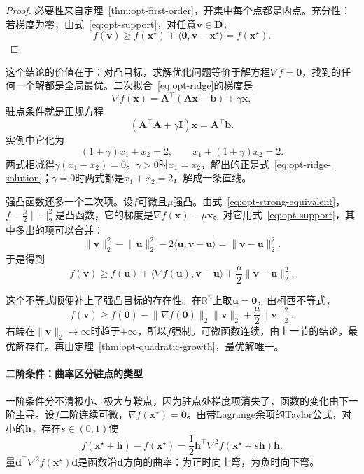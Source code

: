 \begin{proof}
必要性来自定理~\ref{thm:opt-first-order}，开集中每个点都是内点。充分性：若梯度为零，由式~\eqref{eq:opt-support}，对任意$\bm{v}\in\bm{D}$，
\[
 f(\bm{v})\geq f(\bm{x}^\star)+\langle\bm{0},\bm{v}-\bm{x}^\star\rangle=f(\bm{x}^\star).
\]
\end{proof}

这个结论的价值在于：对凸目标，求解优化问题等价于解方程$\nabla f=\bm{0}$，找到的任何一个解都是全局最优。二次拟合~\eqref{eq:opt-ridge}的梯度是
\begin{equation}
 \nabla f(\bm{x})=\bm{A}^\top(\bm{A}\bm{x}-\bm{b})+\gamma\bm{x},
 \label{eq:opt-ridge-gradient}
\end{equation}
驻点条件就是正规方程
\[
 (\bm{A}^\top\bm{A}+\gamma\bm{I})\bm{x}=\bm{A}^\top\bm{b}.
\]
实例中它化为
\[
 (1+\gamma)x_1+x_2=2,\qquad x_1+(1+\gamma)x_2=2.
\]
两式相减得$\gamma(x_1-x_2)=0$。$\gamma>0$时$x_1=x_2$，解出的正是式~\eqref{eq:opt-ridge-solution}；$\gamma=0$时两式都是$x_1+x_2=2$，解成一条直线。

强凸函数还多一个二次项。设$f$可微且$\mu$强凸。由式~\eqref{eq:opt-strong-equivalent}，$f-\frac{\mu}{2}\lVert\cdot\rVert_2^2$是凸函数，它的梯度是$\nabla f(\bm{x})-\mu\bm{x}$。对它用式~\eqref{eq:opt-support}，其中多出的项可以合并：
\[
 \lVert\bm{v}\rVert_2^2-\lVert\bm{u}\rVert_2^2-2\langle\bm{u},\bm{v}-\bm{u}\rangle=\lVert\bm{v}-\bm{u}\rVert_2^2.
\]
于是得到
\begin{equation}
 f(\bm{v})\geq f(\bm{u})+\langle\nabla f(\bm{u}),\bm{v}-\bm{u}\rangle+\frac{\mu}{2}\lVert\bm{v}-\bm{u}\rVert_2^2.
 \label{eq:opt-strong-support}
\end{equation}

这个不等式顺便补上了强凸目标的存在性。在$\mathbb{R}^n$上取$\bm{u}=\bm{0}$，由柯西不等式，
\[
 f(\bm{v})\geq f(\bm{0})-\lVert\nabla f(\bm{0})\rVert_2\lVert\bm{v}\rVert_2+\frac{\mu}{2}\lVert\bm{v}\rVert_2^2.
\]
右端在$\lVert\bm{v}\rVert_2\to\infty$时趋于$+\infty$，所以$f$强制。可微函数连续，由上一节的结论，最优解存在。再由定理~\ref{thm:opt-quadratic-growth}，最优解唯一。

\paragraph{二阶条件：曲率区分驻点的类型}
一阶条件分不清极小、极大与鞍点，因为驻点处梯度项消失了，函数的变化由下一阶主导。设$f$二阶连续可微，$\nabla f(\bm{x}^\star)=\bm{0}$。由带Lagrange余项的Taylor公式，对小的$\bm{h}$，存在$s\in(0,1)$使
\begin{equation}
 f(\bm{x}^\star+\bm{h})-f(\bm{x}^\star)=\frac12\bm{h}^\top\nabla^2f(\bm{x}^\star+s\bm{h})\bm{h}.
 \label{eq:opt-taylor}
\end{equation}
量$\bm{d}^\top\nabla^2f(\bm{x}^\star)\bm{d}$是函数沿$\bm{d}$方向的曲率：为正时向上弯，为负时向下弯。

